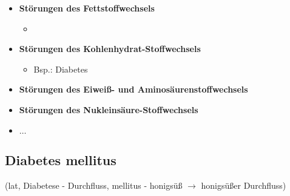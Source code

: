 \begin{itemize}
\begin{itemize}
				\item \textbf{Störungen des Fettstoffwechsels}
					\begin{itemize}
						\item 
					\end{itemize}
				\item \textbf{Störungen des Kohlenhydrat-Stoffwechsels}
					\begin{itemize}
						\item Bsp.: Diabetes
					\end{itemize}
				\item \textbf{Störungen des Eiweiß- und Aminosäurenstoffwechsels}
				\item \textbf{Störungen des Nukleinsäure-Stoffwechsels}
				\item \textbf{$\dots$}
			\end{itemize}
	\end{itemize}
\subsection{Diabetes mellitus} (lat, Diabetese - Durchfluss, mellitus - honigsüß $\rightarrow$ honigsüßer Durchfluss)
